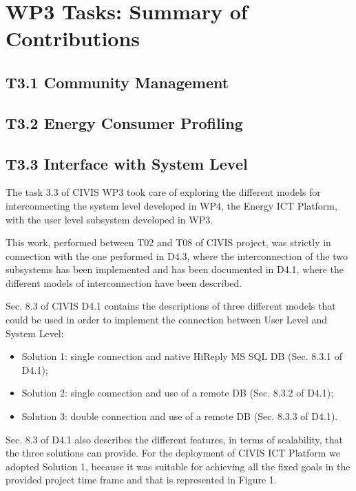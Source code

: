 \section{WP3 Tasks: Summary of Contributions}

\subsection{T3.1 Community Management}

\subsection{T3.2 Energy Consumer Profiling}

\subsection{T3.3 Interface with System Level}

The task 3.3 of CIVIS WP3 took care of exploring the different models for interconnecting the system level developed in WP4, the Energy ICT Platform, with the user level subsystem developed in WP3.

This work, performed between T02 and T08 of CIVIS project, was strictly in connection with the one performed in D4.3, where the interconnection of the two subsystems has been implemented and has been documented in D4.1, where the different models of interconnection have been described.

Sec. 8.3 of CIVIS D4.1 contains the descriptions of three different models that could be used in order to implement the connection between User Level and System Level:

\begin{itemize}
\item Solution 1: single connection and native HiReply MS SQL DB (Sec. 8.3.1 of D4.1);
\item Solution 2: single connection and use of a remote DB (Sec. 8.3.2 of D4.1);
\item Solution 3: double connection and use of a remote DB (Sec. 8.3.3 of D4.1).
\end{itemize}

Sec. 8.3 of D4.1 also describes the different features, in terms of scalability, that the three solutions can provide. For the deployment of CIVIS ICT Platform we adopted Solution 1, because it was suitable for achieving all the fixed goals in the provided project time frame and that is represented in Figure 1.

